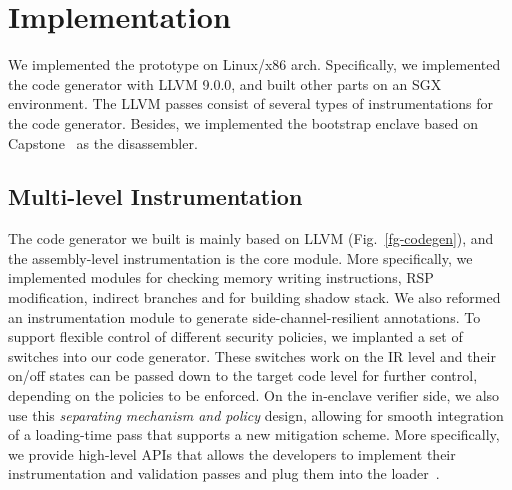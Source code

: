 \section{Implementation}\label{sec-implementation}

We implemented the prototype on Linux/x86 arch. Specifically, we implemented the code generator with LLVM 9.0.0, and built other parts on an SGX environment.
The LLVM passes consist of several types of instrumentations for the code generator. 
Besides, we implemented the bootstrap enclave based on Capstone~\cite{capstone} as the disassembler. 



\subsection{Multi-level Instrumentation}\label{subsec-instrument}





The code generator we built is mainly based on LLVM (Fig.~\ref{fg-codegen}), and the assembly-level instrumentation is the core module. 
More specifically, we implemented modules for checking memory writing instructions, RSP modification, indirect branches and for building shadow stack. We also reformed an instrumentation module to generate side-channel-resilient annotations. 
To support flexible control of different security policies, we implanted a set of switches into our code generator. These switches work on the IR level and their on/off states can be passed down to the target code level for further control, depending on the policies to be enforced. On the in-enclave verifier side, we also use this \textit{separating mechanism and policy} design, allowing for smooth integration of a loading-time pass that supports a new mitigation scheme. More specifically, we provide high-level APIs that allows the developers to implement their instrumentation and validation passes and plug them into the loader~\cite{our-prototype}.
 


